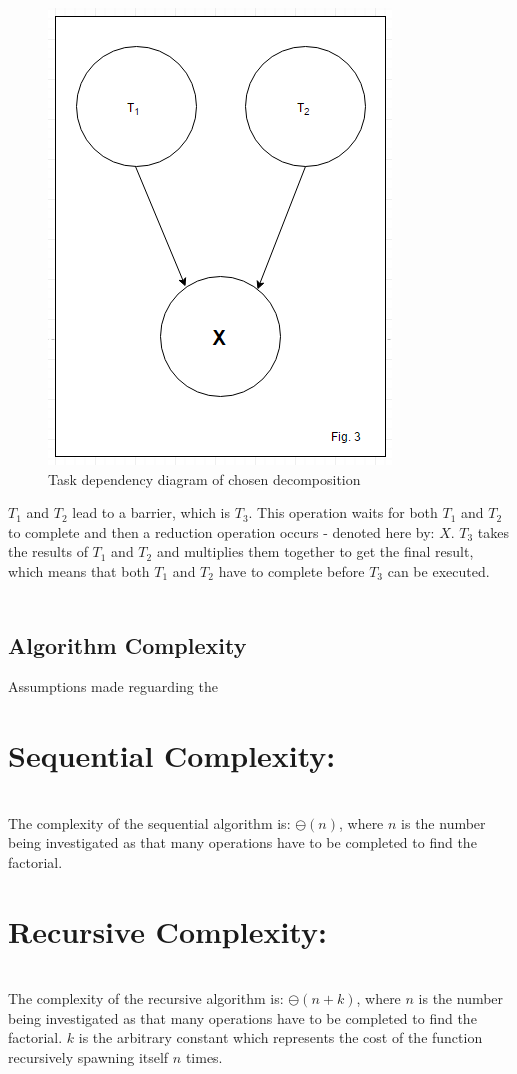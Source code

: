\documentclass[11pt]{article}
\begin{document}
\begin{page}
\begin{figure}
\centering
     \includegraphics[scale=0.75]{parallel_fig3}\\
     Task dependency diagram of chosen decomposition
\end{figure}
\noindent $T_1$ and $T_2$ lead to a barrier, which is $T_3$. This operation waits for both $T_1$ and $T_2$ to complete and then a reduction operation occurs - denoted here by: $X$. $T_3$ takes the results of $T_1$ and $T_2$ and multiplies them together to get the final result, which means that both $T_1$ and $T_2$ have to complete before $T_3$ can be executed.\\\\


\section{Algorithm Complexity}
Assumptions made reguarding the 
\noindent \chapter{Sequential Complexity:} \\
The complexity of the sequential algorithm is: $\ominus(n)$, where $n$ is the number being investigated as that many operations have to be completed to find the factorial.\\

\noindent \chapter{Recursive Complexity:} \\
The complexity of the recursive algorithm is: $\ominus(n + k)$, where $n$ is the number being investigated as that many operations have to be completed to find the factorial. $k$ is the arbitrary constant which represents the cost of the function recursively spawning itself $n$ times.\\


\end{page}
\end{document}
